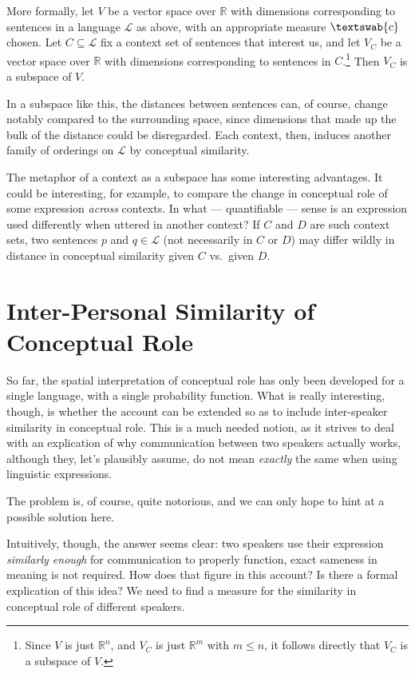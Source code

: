 \documentclass[11pt, a4paper]{scrartcl}
\renewcommand{\i}[1]{\emph{#1}}
\renewcommand{\L}{\mathcal{L}}
\newcommand{\m}[1]{\textswab{#1}}
\begin{document}
More formally, let $V$ be a vector space over $\mathbb{R}$ with dimensions corresponding to sentences in a language $\L$ as above, with an appropriate measure $\m{c}$ chosen. Let $C \subseteq \L$ fix a context set of sentences that interest us, and let $V_C$ be a vector space over $\mathbb{R}$ with dimensions corresponding to sentences in $C$.\footnote{Since $V$ is just $\mathbb{R}^n$, and $V_C$ is just $\mathbb{R}^m$ with $m \leqslant n$, it follows directly that $V_C$ is a subspace of $V$.} Then $V_C$ is a subspace of $V$.

In a subspace like this, the distances between sentences can, of course, change notably compared to the surrounding space, since dimensions that made up the bulk of the distance could be disregarded. Each context, then, induces another family of orderings on $\L$ by conceptual similarity.

The metaphor of a context as a subspace has some interesting advantages. It could be interesting, for example, to compare the change in conceptual role of some expression \i{across} contexts. In what --- quantifiable --- sense is an expression used differently when uttered in another context? If $C$ and $D$ are such context sets, two sentences $p$ and $q \in \L$  (not necessarily in $C$ or $D$) may differ wildly in distance in conceptual similarity given $C$ vs.\ given $D$. 

\section{Inter-Personal Similarity of Conceptual Role}

So far, the spatial interpretation of conceptual role has only been developed for a single language, with a single probability function. What is really interesting, though, is whether the account can be extended so as to include inter-speaker similarity in conceptual role. This is a much needed notion, as it strives to deal with an explication of why communication between two speakers actually works, although they, let's plausibly assume, do not mean \i{exactly} the same when using linguistic expressions. 

The problem is, of course, quite notorious, and we can only hope to hint at a possible solution here.

Intuitively, though, the answer seems clear: two speakers use their expression \i{similarly enough} for communication to properly function, exact sameness in meaning is not required. How does that figure in this account? Is there a formal explication of this idea? We need to find a measure for the similarity in conceptual role of different speakers. 
\end{document}

